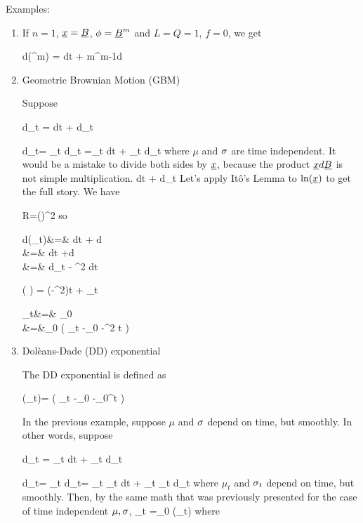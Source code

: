 Examples:
\begin{enumerate}
\item If $n=1$, $\rvx=\rvB$,
$\phi = \rvB^m$
and
$L=Q=1$, $f=0$,
we get

\beq
d(\rvB^m) = dt
+ m\rvB^{m-1}d\rvB
\eeq
\item Geometric Brownian Motion (GBM) 

Suppose

\beq
d\ell_t = \mu dt + \s d\rvB_t
\eeq

\beq
d\rvx_t= \rvx_t d\ell_t
=\mu \rvx_t dt + \s \rvx_t d\rvB_t
\eeq
where $\mu$ and $\sigma$ are time 
independent.
It  would be a mistake
to divide both sides by $\rvx$,
because the product $\rvx d\rvB$ is not
 simple multiplication. 
\beq
{}
\neq
\mu dt + \s d\rvB_t
\eeq
Let's apply It\^o's Lemma to $\ln(\rvx)$
to get the full story.
We have

\beq
R=(\s \rvx)^2
\eeq
so

\beqa
d\ln(\rvx_t)&=&
dt
+
d\rvB
\\
&=&
dt
+\s d\rvB
\\
&=&
d\ell_t - \s^2 dt
\eeqa

\beq
\ln\left(
\right)
=
\left(\mu-\s^2\right)t
+ \s \rvB_t
\eeq

\beqa
\rvx_t&=& \rvx_0
\exp{}
\\
&=&\rvx_0
\exp\left(
\ell_t -\ell_0 
-\s^2 t
\right)
\eeqa

\item Dol\`{e}ans-Dade (DD) exponential

The DD exponential is defined
as

\beq
\cale(\ell_t)=
\exp(
\ell_t -\ell_0 
-\av{\ell_\tau,\ell_\tau }_0^t
)
\eeq

In the previous example, suppose $\mu$ and 
$\sigma$ depend on time, but smoothly. In other words,
suppose

\beq
d\ell_t = \mu_t dt + \s_t d\rvB_t
\eeq

\beq
d\rvx_t=  \rvx_t d\ell_t=
\mu_t \rvx_t dt + \s_t \rvx_t d\rvB_t
\eeq
where $\mu_t$ and $\sigma_t$ depend on time, but smoothly.
 Then, by the same math
that was previously presented for the case of time
independent $\mu, \sigma$,
\beq
\rvx_t =\rvx_0 \cale(\ell_t)
\eeq
where


\end{enumerate}
